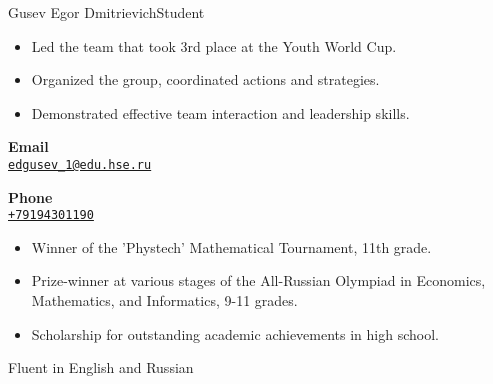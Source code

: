 \documentclass{article}
\begin{document}
\begin{cv}[avatar]{Gusev Egor Dmitrievich}{Student}
\begin{cvevent}[2023][2022]
\end{cvevent}

\begin{cvevent}[2021][2022]
    \begin{itemize}
        \item Led the team that took 3rd place at the Youth World Cup.
        \item Organized the group, coordinated actions and strategies.
        \item Demonstrated effective team interaction and leadership skills.
    \end{itemize}
\end{cvevent}

\cvsidebar 


\begin{cvitem}[Envelope][0.6]
    \textbf{Email}\\
    \href{mailto:edgusev_1@edu.hse.ru}{\texttt{edgusev\_1@edu.hse.ru}}
\end{cvitem}

\cvseparator[3]
\begin{cvitem}[Phone][0.6]
    \textbf{Phone}\\
    \href{tel:+79194301190}{\texttt{+79194301190}}
\end{cvitem}


\begin{cvitem}[leadership]{}
    \begin{itemize}
        \item Winner of the 'Phystech' Mathematical Tournament, 11th grade.
        \item Prize-winner at various stages of the All-Russian Olympiad in Economics, Mathematics, and Informatics, 9-11 grades.
        \item Scholarship for outstanding academic achievements in high school.
    \end{itemize}
\end{cvitem}


\begin{cvitem}
    Fluent in English and Russian
\end{cvitem}


\end{cv}
\end{document}
